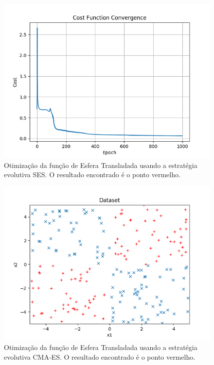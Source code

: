 \documentclass[conference]{IEEEtran}
\begin{document}
\begin{figure}[htbp]
\centering
\centerline{\includegraphics[scale=0.5]{imagens/xor/cost_function_convergence.png}}
\caption{Otimização da função de Esfera Transladada usando a estratégia evolutiva SES. O resultado encontrado é o ponto vermelho.}
\label{xor/cost_function_convergence}
\end{figure}

\begin{figure}[htbp]
\centering
\centerline{\includegraphics[scale=0.5]{imagens/xor/dataset.png}}
\caption{Otimização da função de Esfera Transladada usando a estratégia evolutiva CMA-ES. O resultado encontrado é o ponto vermelho.}
\label{xor/dataset}
\end{figure}
\end{document}
